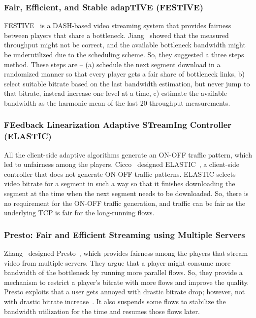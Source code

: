 \subsubsection{Fair, Efficient, and Stable adapTIVE (FESTIVE)}
FESTIVE~\cite{10.1145/2413176.2413189} is a DASH-based video streaming system that provides fairness between players that share a bottleneck. Jiang \etal\ showed that the measured throughput might not be correct, and the available bottleneck bandwidth might be underutilized due to the scheduling scheme. So, they suggested a three steps method. These steps are --
(a) schedule the next segment download in a randomized manner so that every player gets a fair share of bottleneck links,
b) select suitable bitrate based on the last bandwidth estimation, but never jump to that bitrate, instead increase one level at a time,
c) estimate the available bandwidth as the harmonic mean of the last 20 throughput measurements.


\subsubsection{FEedback Linearization Adaptive STreamIng Controller (ELASTIC)}
All the client-side adaptive algorithms generate an ON-OFF traffic pattern, which led to unfairness among the players. Cicco \etal\ designed ELASTIC~\cite{6691442}, a client-side controller that does not generate ON-OFF traffic patterns. ELASTIC selects video bitrate for a segment in such a way so that it finishes downloading the segment at the time when the next segment needs to be downloaded. So, there is no requirement for the ON-OFF traffic generation, and traffic can be fair as the underlying TCP is fair for the long-running flows.

\subsubsection{Presto: Fair and Efficient Streaming using Multiple Servers}
Zhang \etal\ designed Presto~\cite{7249417}, which provides fairness among the players that stream video from multiple servers. They argue that a player might consume more bandwidth of the bottleneck by running more parallel flows. So, they provide a mechanism to restrict a player's bitrate with more flows and improve the quality. Presto exploits that a user gets annoyed with drastic bitrate drop; however, not with drastic bitrate increase~\cite{10.1145/2018602.2018611}. It also suspends some flows to stabilize the bandwidth utilization for the time and resumes those flows later.

